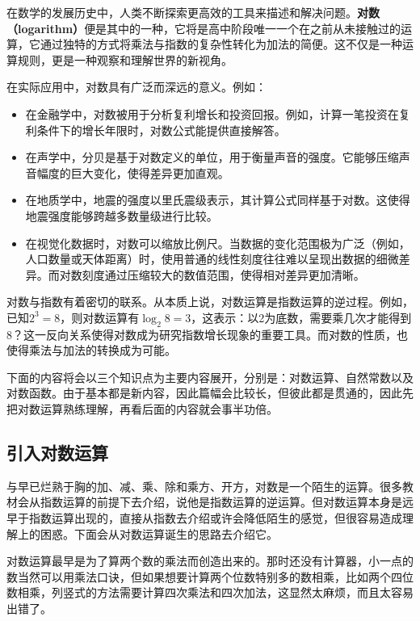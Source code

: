 


在数学的发展历史中，人类不断探索更高效的工具来描述和解决问题。\textbf{对数（logarithm）}便是其中的一种，它将是高中阶段唯一一个在之前从未接触过的运算，它通过独特的方式将乘法与指数的复杂性转化为加法的简便。这不仅是一种运算规则，更是一种观察和理解世界的新视角。

在实际应用中，对数具有广泛而深远的意义。例如：

\begin{itemize}
\item 在金融学中，对数被用于分析复利增长和投资回报。例如，计算一笔投资在复利条件下的增长年限时，对数公式能提供直接解答。
\item 在声学中，分贝是基于对数定义的单位，用于衡量声音的强度。它能够压缩声音幅度的巨大变化，使得差异更加直观。
\item 在地质学中，地震的强度以里氏震级表示，其计算公式同样基于对数。这使得地震强度能够跨越多数量级进行比较。
\item 在视觉化数据时，对数可以缩放比例尺。当数据的变化范围极为广泛（例如，人口数量或天体距离）时，使用普通的线性刻度往往难以呈现出数据的细微差异。而对数刻度通过压缩较大的数值范围，使得相对差异更加清晰。
\end{itemize}

对数与指数有着密切的联系。从本质上说，对数运算是指数运算的逆过程。例如，已知$2^3 = 8$，则对数运算有$\log_2 8 = 3$，这表示：以2为底数，需要乘几次才能得到8？这一反向关系使得对数成为研究指数增长现象的重要工具。而对数的性质，也使得乘法与加法的转换成为可能。

下面的内容将会以三个知识点为主要内容展开，分别是：对数运算、自然常数以及对数函数。由于基本都是新内容，因此篇幅会比较长，但彼此都是贯通的，因此先把对数运算熟练理解，再看后面的内容就会事半功倍。

\subsection{引入对数运算}

与早已烂熟于胸的加、减、乘、除和乘方、开方，对数是一个陌生的运算。很多教材会从指数运算的前提下去介绍，说他是指数运算的逆运算。但对数运算本身是远早于指数运算出现的，直接从指数去介绍或许会降低陌生的感觉，但很容易造成理解上的困惑。下面会从对数运算诞生的思路去介绍它。

对数运算最早是为了算两个数的乘法而创造出来的。那时还没有计算器，小一点的数当然可以用乘法口诀，但如果想要计算两个位数特别多的数相乘，比如两个四位数相乘，列竖式的方法需要计算四次乘法和四次加法，这显然太麻烦，而且太容易出错了。

